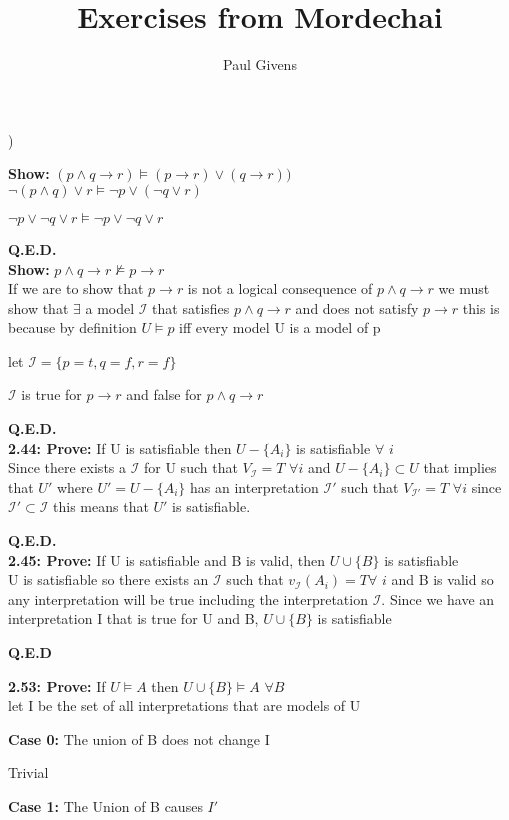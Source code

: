 \documentclass[letterpaper]{article}
\title{Exercises from Mordechai}
\author{Paul Givens}
\begin{document}
) 

\textbf{Show:}
$ (p \wedge q \rightarrow r) \vDash (p \rightarrow r) \vee (q \rightarrow r)) $
\\[1ex]

$ \neg (p \wedge q) \vee r \vDash \neg p \vee (\neg q \vee r) $

$ \neg p \vee \neg q \vee r \vDash \neg p \vee \neg q \vee r $ 

\textbf{Q.E.D.}
\\[1ex]

\textbf{Show:}
$ p \wedge q \rightarrow r \nvDash p \rightarrow r $
\\[1ex]

If we are to show that $ p \rightarrow r $ is not a logical consequence of
$ p \wedge q \rightarrow r $ we must show that $ \exists $ a model
$ \mathscr{I} $ that satisfies $ p \wedge q \rightarrow r $ and does not 
satisfy $ p \rightarrow r $ this is because by definition 
$ U \vDash p $ iff every model U is a model of p 

let $ \mathscr{I} = \{ p = t, q = f, r = f\}$ 

$ \mathscr{I} $ is true for $ p \rightarrow r $ and false for 
$ p \wedge q \rightarrow r $

\textbf{Q.E.D.}
\\[1ex]

\textbf{2.44: Prove:}
If U is satisfiable then $ U - \{A _{i} \} $ is satisfiable $ \forall $ $i$ 
\\[1ex]

Since there exists a $ \mathscr{I} $ for U such that $V_{\mathscr{I}} = T $ 
$\forall i$ and $  U - \{A _{i} \} \subset U$ that implies that $U'$ 
where $U' =  U - \{A _{i} \}$ has an interpretation $\mathscr{I}'$ such that 
$V_{\mathscr{I}'} = T $ $\forall i$ since $\mathscr{I}' \subset \mathscr{I}$
this means that $U'$ is satisfiable.

\textbf{Q.E.D.}
\\[1ex]

\textbf{2.45: Prove:}
If U is satisfiable and B is valid, then $ U \cup \{B\} $ is satisfiable
\\[1ex]

U is satisfiable so there exists an $\mathscr{I}$ such that $v_{\mathscr{I}}
(A_{i}) = T \forall$ $i$ and B is valid so any interpretation will be true
including the interpretation $\mathscr{I}$. Since we have an interpretation
I that is true for U and B, $U \cup \{B\} $ is satisfiable

\textbf{Q.E.D}
\pagebreak

\textbf{2.53: Prove:}
If $U \vDash A$ then $U \cup \{B\} \vDash A $ $\forall B $
\\[1ex]

let I be the set of all interpretations that are models of U

\textbf{Case 0:}
The union of B does not change I

Trivial

\textbf{Case 1:}
The Union of B causes $I'$
\end{document}
